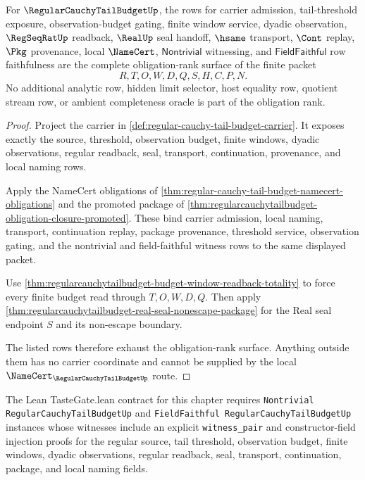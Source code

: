 \begin{theorem}
\label{thm:regular-cauchy-tail-budget-obligation-rank}
For $\RegularCauchyTailBudgetUp$, the rows for carrier admission, tail-threshold exposure, observation-budget gating, finite window service, dyadic observation, $\RegSeqRatUp$ readback, $\RealUp$ seal handoff, $\hsame$ transport, $\Cont$ replay, $\Pkg$ provenance, local $\NameCert$, $\mathsf{Nontrivial}$ witnessing, and $\mathsf{FieldFaithful}$ row faithfulness are the complete obligation-rank surface of the finite packet
$$
R,T,O,W,D,Q,S,H,C,P,N.
$$
No additional analytic row, hidden limit selector, host equality row, quotient stream row, or ambient completeness oracle is part of the obligation rank.
\end{theorem}
\begin{proof}
Project the carrier in \autoref{def:regular-cauchy-tail-budget-carrier}. It exposes exactly the source, threshold, observation budget, finite windows, dyadic observations, regular readback, seal, transport, continuation, provenance, and local naming rows.

Apply the NameCert obligations of \autoref{thm:regular-cauchy-tail-budget-namecert-obligations} and the promoted package of \autoref{thm:regularcauchytailbudget-obligation-closure-promoted}. These bind carrier admission, local naming, transport, continuation replay, package provenance, threshold service, observation gating, and the nontrivial and field-faithful witness rows to the same displayed packet.

Use \autoref{thm:regularcauchytailbudget-budget-window-readback-totality} to force every finite budget read through $T,O,W,D,Q$. Then apply \autoref{thm:regularcauchytailbudget-real-seal-nonescape-package} for the Real seal endpoint $S$ and its non-escape boundary.

The listed rows therefore exhaust the obligation-rank surface. Anything outside them has no carrier coordinate and cannot be supplied by the local $\NameCert_{\RegularCauchyTailBudgetUp}$ route.
\end{proof}

The Lean TasteGate.lean contract for this chapter requires \texttt{Nontrivial RegularCauchyTailBudgetUp} and \texttt{FieldFaithful RegularCauchyTailBudgetUp} instances whose witnesses include an explicit \texttt{witness\_pair} and constructor-field injection proofs for the regular source, tail threshold, observation budget, finite windows, dyadic observations, regular readback, seal, transport, continuation, package, and local naming fields.

